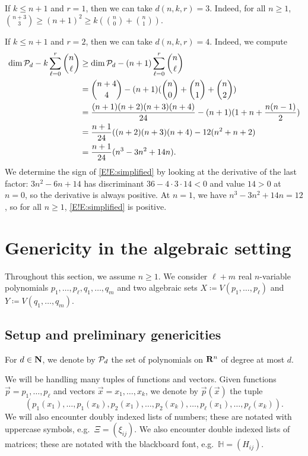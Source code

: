 \begin{example}
\label{E!Ex:poly-degree}
  If $k \leq n + 1$ and $r = 1$, then we can take $d(n, k, r) = 3$. Indeed, for all $n \geq 1$, $\binom{n + 3}{3} \geq (n + 1)^2 \geq k (\binom{n}{0} + \binom{n}{1})$.
  
  If $k \leq n + 1$ and $r = 2$, then we can take $d(n, k, r) = 4$. Indeed, we compute
  \begin{align}
    \dim \mathcal{P}_d - k \sum_{\ell = 0}^r \binom{n}{\ell} & \geq \dim \mathcal{P}_d - (n + 1) \sum_{\ell = 0}^r \binom{n}{\ell} \nonumber \\
    & = \binom{n + 4}{4} - (n + 1)(\binom{n}{0} + \binom{n}{1} + \binom{n}{2}) \nonumber \\
    & = \frac{(n + 1)(n + 2)(n + 3)(n + 4)}{24} - (n + 1)(1 + n + \frac{n (n - 1)}{2}) \nonumber \\
    & = \frac{n + 1}{24} ((n + 2)(n + 3)(n + 4) - 12 (n^2 + n + 2) \nonumber \\
    & = \frac{n + 1}{24} (n^3 - 3n^2 + 14n). \label{E!E:simplified}
  \end{align}
  We determine the sign of \eqref{E!E:simplified} by looking at the derivative of the last factor: $3n^2 - 6n + 14$ has discriminant $36 - 4 \cdot 3 \cdot 14 < 0$ and value $14 > 0$ at $n = 0$, so the derivative is always positive. At $n = 1$, we have $n^3 - 3n^2 + 14n = 12$, so for all $n \geq 1$, \eqref{E!E:simplified} is positive.
\end{example}

\section{Genericity in the algebraic setting}
\label{E!S:Genericity-algebraic}

Throughout this section, we assume $n \geq 1$. We consider $\ell + m$ real $n$-variable polynomials $p_1, \ldots, p_\ell, q_1, \ldots, q_m$ and two algebraic sets $X \coloneq V(p_1, \ldots, p_\ell)$ and $Y \coloneq V(q_1, \ldots, q_m)$.

\subsection{Setup and preliminary genericities}

\begin{notation}
\label{E!N:not}
  For $d \in \mathbf{N}$, we denote by $\mathcal{P}_d$ the set of polynomials on $\mathbf{R}^n$ of degree at most $d$.
  
  We will be handling many tuples of functions and vectors. Given functions $\vec{p} = p_1, \ldots, p_\ell$ and vectors $\vec{x} = x_1, \ldots, x_k$, we denote by $\vec{p}(\vec{x})$ the tuple
  \[
    (p_1(x_1), \ldots, p_1(x_k), p_2(x_1), \ldots, p_2(x_k), \ldots, p_\ell(x_1), \ldots, p_\ell(x_k)).
  \]
  We will also encounter doubly indexed lists of numbers; these are notated with uppercase symbols, e.g.\ $\Xi = (\xi_{ij})$. We also encounter double indexed lists of matrices; these are notated with the blackboard font, e.g.\ $\mathbb{H} = (H_{ij})$.
\end{notation}

